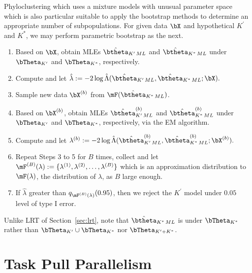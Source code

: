 Phyloclustering which uses a mixture models with unusual parameter space
which is also particular suitable to apply the bootstrap methods to determine
an appropriate number of subpopulations.
For given data $\bX$ and hypothetical $K^\prime$ and $K^*$,
we may perform parametric bootstrap as the next.
\begin{enumerate}[label=Step \arabic*:]
\item
Based on $\bX$,
obtain MLEs $\hat{\btheta}_{K^\prime\,ML}$ and $\hat{\btheta}_{K^*\,ML}$
under $\bTheta_{K^\prime}$ and $\bTheta_{K^*}$, respectively.

\item
Compute and let
$
  \hat{\lambda} :=
  -2\log \hat{\Lambda}
  (\hat{\btheta}_{K^\prime\,ML},
   \hat{\btheta}_{K^*\,ML}; \bX).
$

\item
Sample new data $\bX^{(b)}$ from $\mF(\hat{\btheta}_{K^*\,ML})$.

\item
Based on $\bX^{(b)}$,
obtain MLEs $\hat{\btheta}^{(b)}_{K^\prime\,ML}$ and
$\hat{\btheta}^{(b)}_{K^*\,ML}$
under $\bTheta_{K^\prime}$ and $\bTheta_{K^*}$, respectively,
via the EM algorithm.

\item
Compute and let
$
  \lambda^{(b)} :=
  -2\log \hat{\Lambda}
  (\hat{\btheta}^{(b)}_{K^\prime\,ML},
   \hat{\btheta}^{(b)}_{K^*\,ML}; \bX^{(b)}).
$

\item
Repeat Steps 3 to 5 for $B$ times, collect and let
$\mF^{(B)}(\lambda) := \{\lambda^{(1)}, \lambda^{(2)}, \ldots, \lambda^{(B)}\}$
which is an approximation distribution to $\mF(\lambda)$,
the distribution of $\lambda$, as $B$ large enough.

\item
If $\hat{\lambda}$ greater than $q_{\mF^{(B)}(\lambda)}(0.95)$, then
we reject the $K^\prime$ model under $0.05$ level of type I error.

\end{enumerate}
Unlike LRT of Section~\ref{sec:lrt}, note that
$\hat{\btheta}_{K^*\,ML}$ is under $\bTheta_{K^*}$ rather than
$\bTheta_{K^\prime} \cup \bTheta_{K^*}$ nor $\bTheta_{K^\prime + K^*}$.




\section{Task Pull Parallelism}
\label{sec:task_pull}

